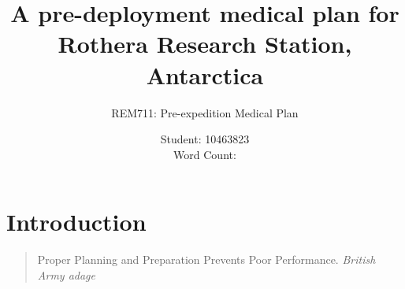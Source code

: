 \documentclass[12pt,a4paper]{article}
\title{A pre-deployment medical plan for Rothera Research Station, Antarctica}
\author{REM711: Pre-expedition Medical Plan}
\date{Student: 10463823 \\ Word Count: }
\begin{document}
\maketitle









\tableofcontents

\section{Introduction}

\begin{quote}
Proper Planning and Preparation Prevents Poor Performance.
\em British Army adage
\end{quote}
\end{document}
